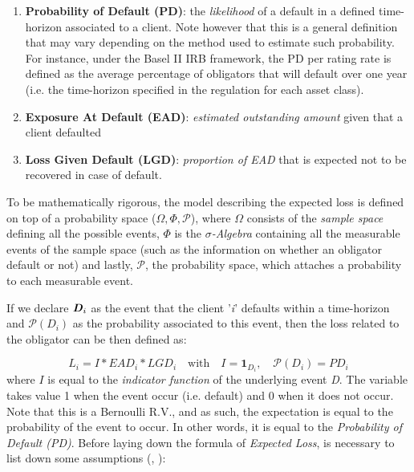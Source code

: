 \documentclass[a4paper,12pt]{article}
\begin{document}
        \begin{enumerate}
            \item \textbf{Probability of Default (PD)}: the \textit{likelihood} of a default in a defined time-horizon associated to a client. Note however that this is a general definition that may vary depending on the method used to estimate such probability. For instance, under the Basel II IRB framework, the PD per rating rate is defined as the average percentage of obligators that will default over one year (i.e. the time-horizon specified in the regulation for each asset class).
            \item \textbf{Exposure At Default (EAD)}: \textit{estimated outstanding amount} given that a client defaulted
            \item \textbf{Loss Given Default (LGD)}: \textit{proportion of EAD} that is expected not to be recovered in case of default.
        \end{enumerate}

    To be mathematically rigorous, the model describing the expected loss is defined on top of a probability space ($\Omega,\Phi,\mathcal{P}$), where $\Omega$ consists of the \textit{sample space} defining all the possible events, 
    $\Phi$ is the \textit{$\sigma$-Algebra} containing all the measurable events of the sample space (such as the information on whether an obligator default or not) and lastly, 
    $\mathcal{P}$, the probability space, which attaches a probability to each measurable event.

    If we declare $\textbf{\textit{D}}_{i}$ as the event that the client '\textit{i}' defaults within a time-horizon and $\mathcal{P}(D_{i})$ as the probability associated to this event, then 
    the loss related to the obligator can be then defined as:
    
    \begin{equation}
        L_{i}=I*EAD_{i}*LGD_{i} \quad\mathrm{with}\quad  I = \mathrm{\textbf{1}}_{D_{i}}, \quad\mathcal{P}(D_{i}) = PD_{i}
    \end{equation}
    where $I$ is equal to the \textit{indicator function} of the underlying event \textit{D}. The variable takes value 1 when the 
    event occur (i.e. default) and 0 when it does not occur. Note that this is a Bernoulli R.V., and as such, the expectation is equal to the probability of the event to occur. In other words, it is equal to the \textit{Probability of Default (PD)}. 
    Before laying down the formula of \textit{Expected Loss}, is necessary to list down some assumptions (\cite{bankofenglandcreditrisk}, \cite{bluhm2016introduction}):
    
\end{document}
